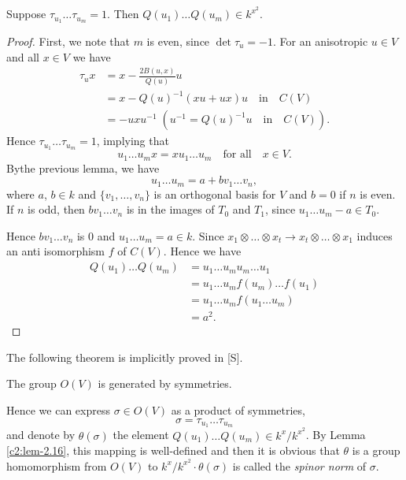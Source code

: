 \begin{lemma}\label{c2:lem-2.16}
Suppose $\tau_{u_{1}}\ldots \tau_{u_{m}}=1$. Then $Q(u_{1})\ldots
Q(u_{m})\in k^{x^{2}}$.
\end{lemma}

\begin{proof}
First, we note that $m$ is even, since $\det \tau_{u}=-1$. For an
aniso\-tropic $u\in V$ and all $x\in V$ we have
\begin{align*}
\tau_{u}x &= x-\frac{2B(u,x)}{Q(u)}u\\
&= x-Q(u)^{-1}(xu+ux)u\quad\text{in}\quad C(V)\\
&= -uxu^{-1} \; (u^{-1}=Q(u)^{-1}u\quad\text{in}\quad C(V)).
\end{align*}
Hence $\tau_{u_{1}}\ldots \tau_{u_{m}}=1$, implying that
$$
u_{1}\ldots u_{m}x=xu_{1}\ldots u_{m}\quad\text{for all}\quad x\in V.
$$
By\pageoriginale the previous lemma, we have
$$
u_{1}\ldots u_{m}=a+bv_{1}\ldots v_{n},
$$
where $a$, $b\in k$ and $\{v_{1},\ldots,v_{n}\}$ is an orthogonal
basis for $V$ and $b=0$ if $n$ is even. If $n$ is odd, then
$bv_{1}\ldots v_{n}$ is in the images of $T_{0}$ and $T_{1}$, since
$u_{1}\ldots u_{m}-a\in T_{0}$.

Hence $bv_{1}\ldots v_{n}$ is $0$ and $u_{1}\ldots u_{m}=a\in
k$. Since $x_{1}\otimes\ldots\otimes x_{t}\to
x_{t}\otimes\ldots\otimes x_{1}$ induces an anti isomorphism $f$ of
$C(V)$. Hence we have
\begin{align*}
Q(u_{1})\ldots Q(u_{m}) &= u_{1}\ldots u_{m}u_{m}\ldots u_{1}\\
&= u_{1}\ldots u_{m}f(u_{m})\ldots f(u_{1})\\
&= u_{1}\ldots u_{m}f(u_{1}\ldots u_{m})\\
&= a^{2}.\tag*{Q.E.D.}
\end{align*}
\end{proof}

The following theorem is implicitly proved in [S].

\setcounter{theorem}{16}
\begin{theorem}\label{c2:thm-2.17}
The group $O(V)$ is generated by symmetries.
\end{theorem}

Hence we can express $\sigma\in O(V)$ as a product of symmetries,
$$
\sigma=\tau_{u_{1}}\ldots \tau_{u_{m}}
$$
and denote by $\theta(\sigma)$ the element $Q(u_{1})\ldots Q(u_{m})\in
k^{x}/k^{x^{2}}$. By Lemma \ref{c2:lem-2.16}, this mapping is
well-defined and then it is obvious that $\theta$ is a group
homomorphism from $O(V)$ to $k^{x}/k^{x^{2}}\cdot \theta(\sigma)$ is
called the {\em spinor norm} of $\sigma$.

